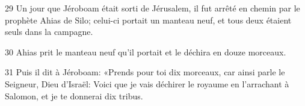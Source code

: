 
29 Un jour que Jéroboam était sorti de Jérusalem, il fut arrêté en chemin par le prophète Ahias de Silo; celui-ci portait un manteau neuf, et tous deux étaient seuls dans la campagne.

30 Ahias prit le manteau neuf qu’il portait et le déchira en douze morceaux.

31 Puis il dit à Jéroboam: «Prends pour toi dix morceaux, car ainsi parle le Seigneur, Dieu d’Israël: Voici que je vais déchirer le royaume en l’arrachant à Salomon, et je te donnerai dix tribus.
